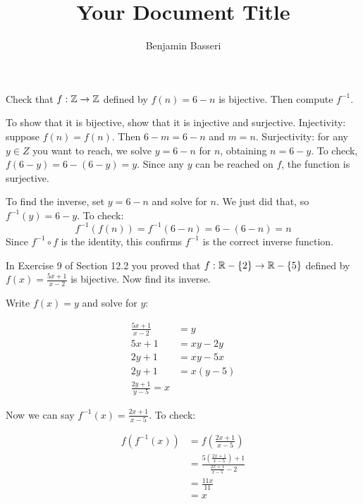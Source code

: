 \documentclass{article}
\title{Your Document Title}
\author{Benjamin Basseri}
\begin{document}
\maketitle
\begin{problem}
Check that $f: \mathbb{Z} \to \mathbb{Z}$ defined by $f(n) = 6 - n$ is bijective. Then compute $f^{-1}$.
\end{problem}

To show that it is bijective, show that it is injective and surjective. Injectivity: suppose $f(n) = f(n)$. Then $6 - m = 6 - n$ and $m = n$. Surjectivity: for any $y \in Z$ you want to reach, we solve $y = 6 - n$ for $n$, obtaining $n = 6 -y$. To check, $f(6 - y) = 6 - (6 - y) = y$. Since any $y$ can be reached on $f$, the function is surjective.

To find the inverse, set $y = 6 - n$ and solve for $n$. We just did that, so $f^{-1}(y) = 6 - y$. To check:
$$f^{-1}(f(n)) = f^{-1}(6 - n) = 6 - (6 - n) = n$$
Since $f^{-1} \circ f$ is the identity, this confirms $f^{-1}$ is the correct inverse function.

\begin{problem}
In Exercise 9 of Section 12.2 you proved that $f: \mathbb{R} - \{2\} \to \mathbb{R} - \{5\}$ defined by $f(x) = \frac{5x + 1}{x -2}$ is bijective. Now find its inverse.
\end{problem}


Write $f(x) = y$ and solve for $y$:

\begin{align*}
  \frac{5x + 1}{x - 2} & = y       \\
  5x + 1               & = xy - 2y \\
  2y + 1               & = xy - 5x \\
  2y + 1               & = x(y-5)  \\
  \frac{2y + 1}{y - 5} = x
\end{align*}

Now we can say $f^{-1}(x) = \frac{2x + 1}{x - 5}$. To check:

\begin{align*}
  f(f^{-1}(x)) & = f\left(\frac{2x + 1}{x - 5}\right)                                    \\
               & = \frac{5\left(\frac{2x + 1}{x - 5}\right) + 1}{\frac{2x + 1}{x - 5}-2} \\
               & = \frac{11x}{11}                                                        \\
               & = x
\end{align*}
\end{document}
